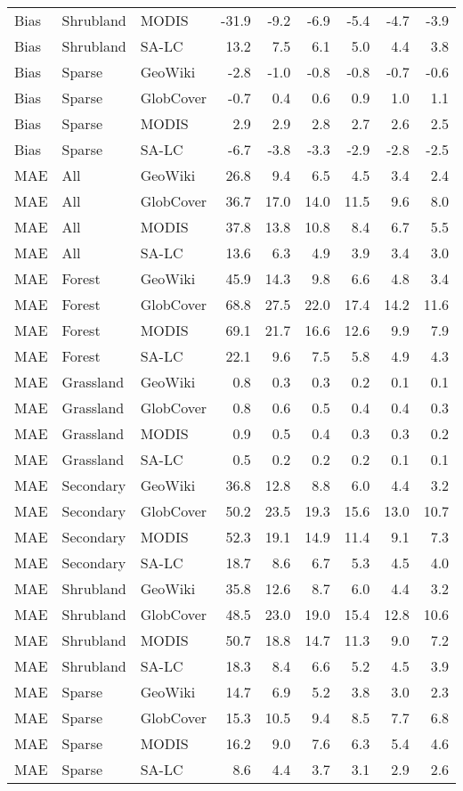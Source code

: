\begin{longtable}{lllrrrrrr}
  Bias & Shrubland & MODIS & -31.9 & -9.2 & -6.9 & -5.4 & -4.7 & -3.9 \\ 
  Bias & Shrubland & SA-LC & 13.2 & 7.5 & 6.1 & 5.0 & 4.4 & 3.8 \\ 
  Bias & Sparse & GeoWiki & -2.8 & -1.0 & -0.8 & -0.8 & -0.7 & -0.6 \\ 
  Bias & Sparse & GlobCover & -0.7 & 0.4 & 0.6 & 0.9 & 1.0 & 1.1 \\ 
  Bias & Sparse & MODIS & 2.9 & 2.9 & 2.8 & 2.7 & 2.6 & 2.5 \\ 
  Bias & Sparse & SA-LC & -6.7 & -3.8 & -3.3 & -2.9 & -2.8 & -2.5 \\ 
  MAE & All & GeoWiki & 26.8 & 9.4 & 6.5 & 4.5 & 3.4 & 2.4 \\ 
  MAE & All & GlobCover & 36.7 & 17.0 & 14.0 & 11.5 & 9.6 & 8.0 \\ 
  MAE & All & MODIS & 37.8 & 13.8 & 10.8 & 8.4 & 6.7 & 5.5 \\ 
  MAE & All & SA-LC & 13.6 & 6.3 & 4.9 & 3.9 & 3.4 & 3.0 \\ 
  MAE & Forest & GeoWiki & 45.9 & 14.3 & 9.8 & 6.6 & 4.8 & 3.4 \\ 
  MAE & Forest & GlobCover & 68.8 & 27.5 & 22.0 & 17.4 & 14.2 & 11.6 \\ 
  MAE & Forest & MODIS & 69.1 & 21.7 & 16.6 & 12.6 & 9.9 & 7.9 \\ 
  MAE & Forest & SA-LC & 22.1 & 9.6 & 7.5 & 5.8 & 4.9 & 4.3 \\ 
  MAE & Grassland & GeoWiki & 0.8 & 0.3 & 0.3 & 0.2 & 0.1 & 0.1 \\ 
  MAE & Grassland & GlobCover & 0.8 & 0.6 & 0.5 & 0.4 & 0.4 & 0.3 \\ 
  MAE & Grassland & MODIS & 0.9 & 0.5 & 0.4 & 0.3 & 0.3 & 0.2 \\ 
  MAE & Grassland & SA-LC & 0.5 & 0.2 & 0.2 & 0.2 & 0.1 & 0.1 \\ 
  MAE & Secondary & GeoWiki & 36.8 & 12.8 & 8.8 & 6.0 & 4.4 & 3.2 \\ 
  MAE & Secondary & GlobCover & 50.2 & 23.5 & 19.3 & 15.6 & 13.0 & 10.7 \\ 
  MAE & Secondary & MODIS & 52.3 & 19.1 & 14.9 & 11.4 & 9.1 & 7.3 \\ 
  MAE & Secondary & SA-LC & 18.7 & 8.6 & 6.7 & 5.3 & 4.5 & 4.0 \\ 
  MAE & Shrubland & GeoWiki & 35.8 & 12.6 & 8.7 & 6.0 & 4.4 & 3.2 \\ 
  MAE & Shrubland & GlobCover & 48.5 & 23.0 & 19.0 & 15.4 & 12.8 & 10.6 \\ 
  MAE & Shrubland & MODIS & 50.7 & 18.8 & 14.7 & 11.3 & 9.0 & 7.2 \\ 
  MAE & Shrubland & SA-LC & 18.3 & 8.4 & 6.6 & 5.2 & 4.5 & 3.9 \\ 
  MAE & Sparse & GeoWiki & 14.7 & 6.9 & 5.2 & 3.8 & 3.0 & 2.3 \\ 
  MAE & Sparse & GlobCover & 15.3 & 10.5 & 9.4 & 8.5 & 7.7 & 6.8 \\ 
  MAE & Sparse & MODIS & 16.2 & 9.0 & 7.6 & 6.3 & 5.4 & 4.6 \\ 
  MAE & Sparse & SA-LC & 8.6 & 4.4 & 3.7 & 3.1 & 2.9 & 2.6 \\ 
   \hline
\hline
\end{longtable}
